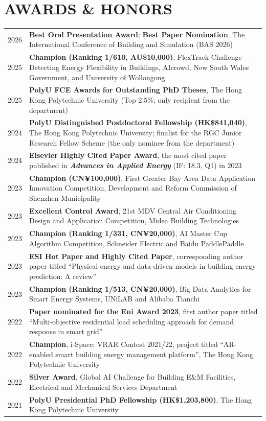 \documentclass[11pt,a4paper]{article}
\newcounter{cvbookmark}
\newcommand{\cvoutline}[2]{%
  \stepcounter{cvbookmark}%
  \pdfbookmark[#1]{#2}{cvbookmark.\thecvbookmark}%
}
\newcommand{\cvsection}[2]{%
  \cvoutline{1}{#1}%
  \section*{#2}%
}
\newlength{\cvitemgap}
\newcommand{\cvtabrowgap}{\\\noalign{\vskip\cvitemgap}}
\begin{document}
\cvsection{AWARDS \& HONORS}{AWARDS \& HONORS}
\begin{longtable}{@{}p{1cm}@{\hspace{0.20cm}}>{\justifying\arraybackslash}p{\dimexpr\textwidth-1.20cm\relax}@{}}
2026 & \textbf{Best Oral Presentation Award}; \textbf{Best Paper Nomination}, The International Conference of Building and Simulation (BAS 2026) \cvtabrowgap
2025 & \textbf{Champion (Ranking 1/610, AU\$10,000)}, FlexTrack Challenge---Detecting Energy Flexibility in Buildings, AIcrowd, New South Wales Government, and University of Wollongong \cvtabrowgap
2025 & \textbf{PolyU FCE Awards for Outstanding PhD Theses}, The Hong Kong Polytechnic University (Top 2.5\%; only recipient from the department) \cvtabrowgap
2024 & \textbf{PolyU Distinguished Postdoctoral Fellowship (HK\$841,040)}, The Hong Kong Polytechnic University; finalist for the RGC Junior Research Fellow Scheme (the only nominee from the department) \cvtabrowgap
2024 & \textbf{Elsevier Highly Cited Paper Award}, the most cited paper published in \textbf{\textit{Advances in Applied Energy}} (IF: 18.3, Q1) in 2023 \cvtabrowgap
2023 & \textbf{Champion (CN¥100,000)}, First Greater Bay Area Data Application Innovation Competition, Development and Reform Commission of Shenzhen Municipality \cvtabrowgap
2023 & \textbf{Excellent Control Award}, 21st MDV Central Air Conditioning Design and Application Competition, Midea Building Technologies \cvtabrowgap
2023 & \textbf{Champion (Ranking 1/331, CN¥20,000)}, AI Master Cup Algorithm Competition, Schneider Electric and Baidu PaddlePaddle \cvtabrowgap
2023 & \textbf{ESI Hot Paper and Highly Cited Paper}, corresponding author paper titled ``Physical energy and data-driven models in building energy prediction: A review'' \cvtabrowgap
2023 & \textbf{Champion (Ranking 1/513, CN¥20,000)}, Big Data Analytics for Smart Energy Systems, UNiLAB and Alibaba Tianchi \cvtabrowgap
2022 & \textbf{Paper nominated for the Eni Award 2023}, first author paper titled ``Multi-objective residential load scheduling approach for demand response in smart grid'' \cvtabrowgap
2022 & \textbf{Champion}, i-Space: VRAR Contest 2021/22, project titled ``AR-enabled smart building energy management platform'', The Hong Kong Polytechnic University \cvtabrowgap
2022 & \textbf{Silver Award}, Global AI Challenge for Building E\&M Facilities, Electrical and Mechanical Services Department \cvtabrowgap
2021 & \textbf{PolyU Presidential PhD Fellowship (HK\$1,203,800)}, The Hong Kong Polytechnic University \\
\end{longtable}
\end{document}
